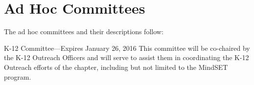 \section{Ad Hoc Committees}\label{sec:AdHocCommittees} The ad hoc committees and their descriptions follow:\\
\begin{enumsubsection}
\item{K-12 Committee---Expires January 26, 2016}  This committee will be co-chaired by the K-12 Outreach Officers and will serve to assist them in coordinating the K-12 Outreach efforts of the chapter, including but not limited to the MindSET program.
\end{enumsubsection}

